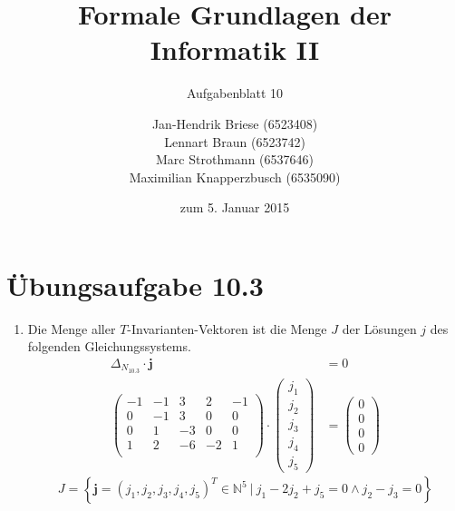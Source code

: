 \documentclass[a4paper]{scrartcl}
\title{Formale Grundlagen der Informatik II}
\subtitle{Aufgabenblatt 10}
\author{
    Jan-Hendrik Briese (6523408) \\
    Lennart Braun (6523742) \\
    Marc Strothmann (6537646) \\
    Maximilian Knapperzbusch (6535090)
}
\date{zum 5. Januar 2015}
\begin{document}
\maketitle

\section*{Übungsaufgabe 10.3} 
\begin{enumerate}
    \item
        Die Menge aller $T$-Invarianten-Vektoren ist die Menge $J$ der Lösungen
        $j$ des folgenden Gleichungssystems.
        \begin{equation}
            \begin{split}
                \Delta_{N_{10.3}} \cdot \textbf{j} &= 0 \\
                \begin{pmatrix}
                    -1 & -1 &  3 &  2 & -1 \\
                     0 & -1 &  3 &  0 &  0 \\
                     0 &  1 & -3 &  0 &  0 \\
                     1 &  2 & -6 & -2 &  1 \\
                \end{pmatrix}
                \cdot
                \begin{pmatrix}
                    j_1 \\ j_2 \\ j_3 \\ j_4 \\ j_5
                \end{pmatrix}
                &=
                \begin{pmatrix}
                    0 \\ 0 \\ 0 \\ 0
                \end{pmatrix}
            \end{split}
        \end{equation}
        \begin{equation}
            J = \left\{
                \textbf{j} = \left( j_1, j_2, j_3, j_4, j_5 \right)^T
                \in \mathbb{N}^5
                \ |\  j_1 - 2j_2 + j_5 = 0 \land j_2 - j_3 = 0
                \right\}
        \end{equation}
        

\end{enumerate}
\end{document}
